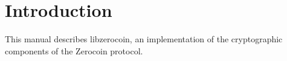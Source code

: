\section{Introduction}

This manual describes \textsf{libzerocoin}, an implementation of the cryptographic components of the Zerocoin protocol.